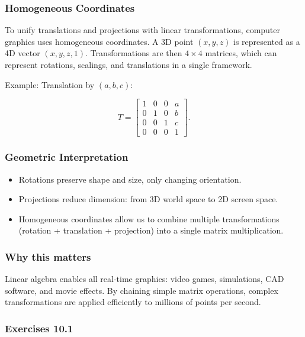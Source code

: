 \documentclass[
  12pt,
  a4paper,
]{article}
\begin{document}
\subsubsection{Homogeneous Coordinates}\label{homogeneous-coordinates}

To unify translations and projections with linear transformations,
computer graphics uses homogeneous coordinates. A 3D point \((x,y,z)\)
is represented as a 4D vector \((x,y,z,1)\). Transformations are then
\(4 \times 4\) matrices, which can represent rotations, scalings, and
translations in a single framework.

Example: Translation by \((a,b,c)\):

\[T = \begin{bmatrix}
1 & 0 & 0 & a \\
0 & 1 & 0 & b \\
0 & 0 & 1 & c \\
0 & 0 & 0 & 1
\end{bmatrix}.\]

\subsubsection{Geometric
Interpretation}\label{geometric-interpretation-23}

\begin{itemize}
\item
  Rotations preserve shape and size, only changing orientation.
\item
  Projections reduce dimension: from 3D world space to 2D screen space.
\item
  Homogeneous coordinates allow us to combine multiple transformations
  (rotation + translation + projection) into a single matrix
  multiplication.
\end{itemize}

\subsubsection{Why this matters}\label{why-this-matters-36}

Linear algebra enables all real-time graphics: video games, simulations,
CAD software, and movie effects. By chaining simple matrix operations,
complex transformations are applied efficiently to millions of points
per second.

\subsubsection{Exercises 10.1}\label{exercises-101}
\end{document}
